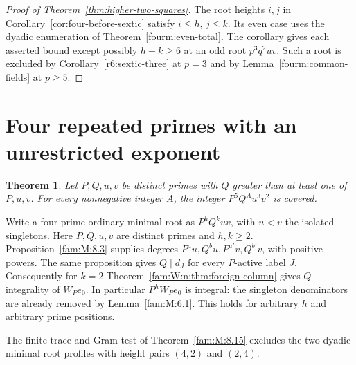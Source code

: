 \documentclass[11pt,a4paper]{article}
\numberwithin{equation}{section}
\newtheorem{theorem}{Theorem}[section]
\theoremstyle{remark}
\begin{document}
\begin{proof}[Proof of Theorem~\ref{thm:higher-two-squares}]
The root heights $i,j$ in Corollary~\ref{cor:four-before-sextic} satisfy
$i\le h$, $j\le k$. Its even case uses the \href{https://github.com/sebastienpalcoux/WGT-fusion-categories/blob/f7f9f9a02f3116e61eb9dca4eebfed77001494e8/code/four_primes/dyadic_total_height.py}{dyadic enumeration} of Theorem~\ref{fourm:even-total}. The corollary gives each asserted bound except
possibly $h+k\ge6$ at an odd root $p^3q^2uv$. Such a root is excluded
by Corollary~\ref{r6:sextic-three} at $p=3$ and by
Lemma~\ref{fourm:common-fields} at $p\ge5$.
\end{proof}

\section{Four repeated primes with an unrestricted exponent}\label{fam:W:sec:5}\label{fam:W:n:sec:four-next}
\begin{theorem}\label{fam:W:1.2}\label{fam:W:n:thm:unbounded}
Let $P,Q,u,v$ be distinct primes with $Q$ greater than at least one of
$P,u,v$. For every nonnegative integer $A$, the integer
$P^5Q^A u^3v^2$ is covered.
\end{theorem}

Write a four-prime ordinary minimal root as $P^h Q^k uv$, with
$u<v$ the isolated singletons. Here $P,Q,u,v$ are distinct primes
and $h,k\ge2$. Proposition~\ref{fam:M:8.3} supplies degrees
$P^a u,Q^b u,P^{a'}v,Q^{b'}v$, with positive powers.
The same proposition gives $Q\mid d_J$ for every $P$-active label $J$.
Consequently for $k=2$ Theorem~\ref{fam:W:n:thm:foreign-column} gives
$Q$-integrality of $W_Pe_0$. In particular $P^hW_P e_0$ is integral:
the singleton denominators are already removed by Lemma~\ref{fam:M:6.1}.
This holds for arbitrary $h$ and arbitrary prime positions.

The finite trace and Gram test of Theorem~\ref{fam:M:8.15} excludes the
two dyadic minimal root profiles with height pairs $(4,2)$ and $(2,4)$.
\end{document}
